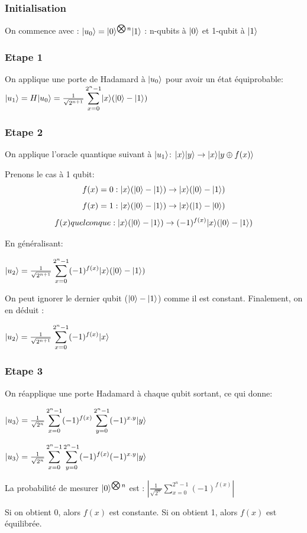 \documentclass[12pt,a4paper]{article}
\DeclarePairedDelimiter\ket{\lvert}{\rangle}
\begin{document}
\subsubsection{Initialisation}
On commence avec :
$\ket{u_0} = \ket{0}^{\bigotimes n}\ket{1}$
: n-qubits à $\ket{0}$ et 1-qubit à $\ket{1}$

\subsubsection{Etape 1}

On applique une porte de Hadamard à $\ket{u_0}$ pour avoir un état équiprobable:
$\ket{u_1} = H\ket{u_0} = \frac{1}{\sqrt{2^{n + 1}}}
\displaystyle\sum_{x=0}^{2^n-1} \ket{x}(\ket{0} - \ket{1})$

\subsubsection{Etape 2}
On applique l'oracle quantique suivant à $\ket{u_1}$: $\ket{x}\ket{y}\rightarrow\ket{x}\ket{y\oplus f(x)}$

Prenons le cas à 1 qubit:
\[
f(x) = 0: \ket{x}(\ket{0} - \ket{1}) \rightarrow \ket{x}(\ket{0} - \ket{1})
\]
\[
f(x) = 1: \ket{x}(\ket{0} - \ket{1}) \rightarrow \ket{x}(\ket{1} - \ket{0})
\]
\[
f(x) quelconque: \ket{x}(\ket{0} - \ket{1}) \rightarrow (-1)^{f(x)}\ket{x}(\ket{0} - \ket{1})
\]

En généralisant:

$\ket{u_2} = \frac{1}{\sqrt{2^{n + 1}}}
\displaystyle\sum_{x=0}^{2^n-1} (-1)^{f(x)}\ket{x}(\ket{0} - \ket{1})$

On peut ignorer le dernier qubit ($\ket{0} - \ket{1}$) comme il est
constant. Finalement, on en déduit :

$\ket{u_2} = \frac{1}{\sqrt{2^{n + 1}}}
\displaystyle\sum_{x=0}^{2^n-1} (-1)^{f(x)}\ket{x}$

\subsubsection{Etape 3}
On réapplique une porte Hadamard à chaque qubit sortant, ce qui donne:

$\ket{u_3} = \frac{1}{\sqrt{2^{n}}}
\displaystyle\sum_{x=0}^{2^n-1} (-1)^{f(x)} \displaystyle\sum_{y=0}^{2^n-1} (-1)^{x.y}\ket{y}$

$\ket{u_3} = \frac{1}{\sqrt{2^{n}}}
\displaystyle\sum_{x=0}^{2^n-1} \displaystyle\sum_{y=0}^{2^n-1}(-1)^{f(x)} (-1)^{x.y}\ket{y}$

La probabilité de mesurer $\ket{0}^{\bigotimes n}$ est : 
$|\frac{1}{\sqrt{2^{n}}}\displaystyle\sum_{x=0}^{2^n-1}(-1)^{f(x)}|$

Si on obtient 0, alors $f(x)$ est constante. Si on obtient 1, alors $f(x)$ est équilibrée.
\end{document}
